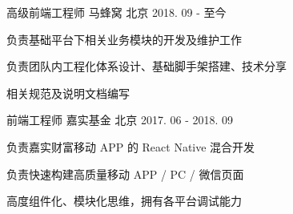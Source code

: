 

\begin{cventries}

  \cventry
    {高级前端工程师} %
    {马蜂窝} %
    {北京} %
    {2018. 09 - 至今} %
    {
      \begin{cvitems} %
        \item {负责基础平台下相关业务模块的开发及维护工作}
        \item {负责团队内工程化体系设计、基础脚手架搭建、技术分享}
        \item {相关规范及说明文档编写}
      \end{cvitems}
    }

  \cventry
    {前端工程师} %
    {嘉实基金} %
    {北京} %
    {2017. 06  - 2018. 09 } %
    {
      \begin{cvitems} %
        \item {负责嘉实财富移动 APP 的 React Native 混合开发}
        \item {负责快速构建高质量移动 APP / PC / 微信页面}
        \item {高度组件化、模块化思维，拥有各平台调试能力}
      \end{cvitems}
    }

\end{cventries}
